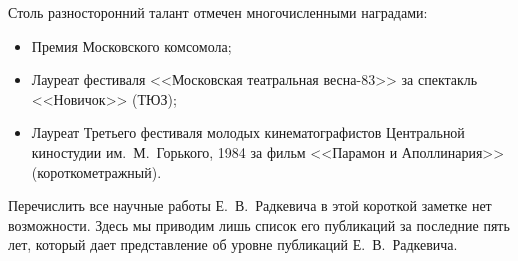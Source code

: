 Столь разносторонний талант отмечен многочисленными наградами:

\begin{itemize}

\item[--] Премия Московского комсомола; 

\item[--] Лауреат фестиваля <<Московская театральная весна-83>> за спектакль <<Новичок>> (ТЮЗ); 

\item[--] Лауреат Третьего фестиваля молодых кинематографистов Центральной киностудии им.~М.~Горького, 1984 за фильм <<Парамон и Аполлинария>> (короткометражный).

\end{itemize}





Перечислить все научные работы Е.~В.~Радкевича в этой короткой заметке нет возможности. Здесь мы приводим лишь список его публикаций за последние пять лет, который дает представление об уровне публикаций Е.~В.~Радкевича.





\newpage



\PersonRadRef



